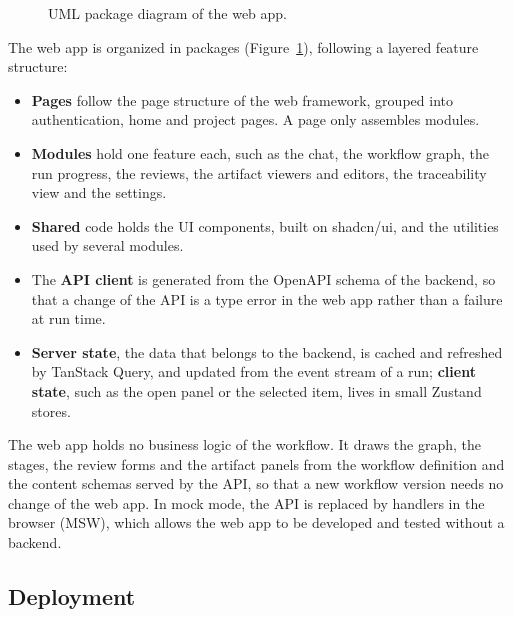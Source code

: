 \begin{figure}[H]
    \centering
    \resizebox{\linewidth}{!}{}
    \caption{UML package diagram of the web app.}
    \label{fig:sd-frontend}
\end{figure}
The web app is organized in packages (Figure~\ref{fig:sd-frontend}), following a layered feature structure:
\begin{itemize}
    \item \textbf{Pages} follow the page structure of the web framework, grouped into authentication, home and project pages. A page only assembles modules.
    \item \textbf{Modules} hold one feature each, such as the chat, the workflow graph, the run progress, the reviews, the artifact viewers and editors, the traceability view and the settings.
    \item \textbf{Shared} code holds the UI components, built on shadcn/ui, and the utilities used by several modules.
    \item The \textbf{API client} is generated from the OpenAPI schema of the backend, so that a change of the API is a type error in the web app rather than a failure at run time.
    \item \textbf{Server state}, the data that belongs to the backend, is cached and refreshed by TanStack Query, and updated from the event stream of a run; \textbf{client state}, such as the open panel or the selected item, lives in small Zustand stores.
\end{itemize}
The web app holds no business logic of the workflow. It draws the graph, the stages, the review forms and the artifact panels from the workflow definition and the content schemas served by the API, so that a new workflow version needs no change of the web app. In mock mode, the API is replaced by handlers in the browser (MSW), which allows the web app to be developed and tested without a backend.

\subsection{Deployment}
\label{sec:sd-deployment}

